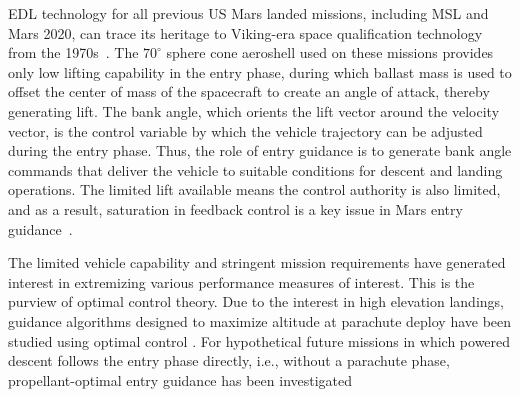 EDL technology for all previous US Mars landed missions, including MSL and Mars 2020, can trace its heritage to Viking-era space qualification technology from the 1970s~\cite{BraunMarsEDL}. The $ 70^{\circ} $ sphere cone aeroshell used on these missions provides only low lifting capability in the entry phase, during which ballast mass is used to offset the center of mass of the spacecraft to create an angle of attack, thereby generating lift.
The bank angle, which orients the lift vector around the velocity vector, is the control variable by which the vehicle trajectory can be adjusted during the entry phase. Thus, the role of entry guidance is to generate bank angle commands that deliver the vehicle to suitable conditions for descent and landing operations. 
The limited lift available means the control authority is also limited, and as a result, saturation in feedback control is a key issue in Mars entry guidance~\cite{JoelController}.


The limited vehicle capability and stringent mission requirements have generated interest in extremizing various performance measures of interest. This is the purview of optimal control theory. Due to the interest in high elevation landings, guidance algorithms designed to maximize altitude at parachute deploy have been studied using optimal control
\cite{HighElevation,AltitudeOptimization,AltitudeOptimizationIndirect,duan2018mars}. 
For hypothetical future missions in which powered descent follows the entry phase directly, i.e., without a parachute phase, propellant-optimal entry guidance has been investigated~\cite{LuAdaptiveEDL,FuelOptimalEndtoEnd,NoyesSRP}

